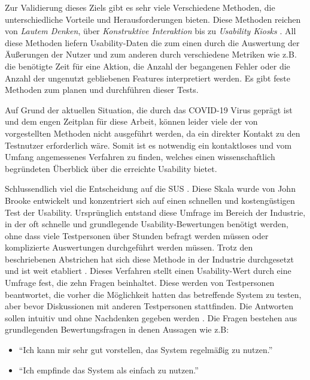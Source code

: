 	\vspace{0.25cm}
	
	Zur Validierung dieses Ziels gibt es sehr viele Verschiedene Methoden, die unterschiedliche Vorteile und Herausforderungen bieten. Diese Methoden reichen von \textit{Lautem Denken}, über \textit{Konstruktive Interaktion} bis zu \textit{Usability Kiosks} \cite{Nielsen.20091993}. All diese Methoden liefern Usability-Daten die zum einen durch die Auswertung der Äußerungen der Nutzer und zum anderen durch verschiedene Metriken wie z.B. die benötigte Zeit für eine Aktion, die Anzahl der begangenen Fehler oder die Anzahl der ungenutzt gebliebenen Features interpretiert werden. Es gibt feste Methoden zum planen und durchführen dieser Tests.
	
	\vspace{0.25cm}
	
	Auf Grund der aktuellen Situation, die durch das COVID-19 Virus geprägt ist und dem engen Zeitplan für diese Arbeit, können leider viele der von \cite{Nielsen.20091993} vorgestellten Methoden nicht ausgeführt werden, da ein direkter Kontakt zu den Testnutzer erforderlich wäre. Somit ist es notwendig ein kontaktloses und vom Umfang angemessenes Verfahren zu finden, welches einen wissenschaftlich begründeten Überblick über die erreichte Usability bietet.
	
	Schlussendlich viel die Entscheidung auf die \ac{SUS} \cite{Brooke.1996}. Diese Skala wurde von John Brooke entwickelt und konzentriert sich auf einen schnellen und kostengüstigen Test der Usability. Ursprünglich entstand diese Umfrage im Bereich der Industrie, in der oft schnelle und grundlegende Usability-Bewertungen benötigt werden, ohne dass viele Testpersonen über Stunden befragt werden müssen oder komplizierte Auswertungen durchgeführt werden müssen. Trotz den beschriebenen Abstrichen hat sich diese Methode in der Industrie durchgesetzt und ist weit etabliert \cite{MatthiasRauer.2011}. Dieses Verfahren stellt einen Usability-Wert durch eine Umfrage fest, die zehn Fragen beinhaltet. Diese werden von Testpersonen beantwortet, die vorher die Möglichkeit hatten das betreffende System zu testen, aber bevor Diskussionen mit anderen Testpersonen stattfinden. Die Antworten sollen intuitiv und ohne Nachdenken gegeben werden \cite{Brooke.1996}. Die Fragen bestehen aus grundlegenden Bewertungsfragen in denen Aussagen wie z.B:
	
	\begin{itemize}
		\item \enquote{Ich kann mir sehr gut vorstellen, das System regelmäßig zu nutzen.}
		\item \enquote{Ich empfinde das System als einfach zu nutzen.}
	\end{itemize}

